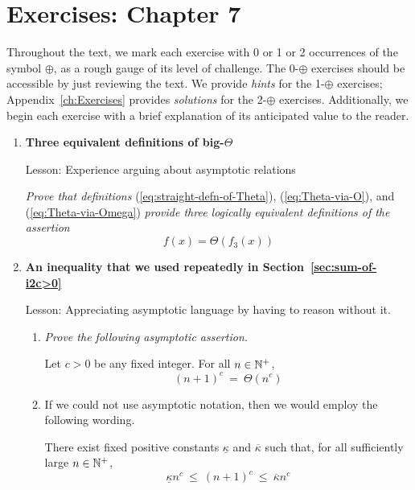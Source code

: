 
\section{Exercises: Chapter 7}

Throughout the text, we mark each exercise with 0 or 1 or 2 occurrences of the symbol $\oplus$, as a rough gauge of its level of challenge.  The 0-$\oplus$ exercises should be accessible by just
reviewing the text.  We provide {\em hints} for the 1-$\oplus$ exercises; Appendix~\ref{ch:Exercises} provides {\em solutions} for the 2-$\oplus$ exercises.  Additionally, we begin each exercise with a brief explanation of its anticipated value to the reader.

\begin{enumerate}
\item
{\bf Three equivalent definitions of big-$\Theta$}

{\sc Lesson:} Experience arguing about asymptotic relations

\smallskip

{\em Prove that definitions} (\ref{eq:straight-defn-of-Theta}), (\ref{eq:Theta-via-O}), and (\ref{eq:Theta-via-Omega}) {\em provide three logically equivalent definitions of the assertion}
\[  f(x) = \Theta(f_3(x)) \]

\medskip\item
{\bf An inequality that we used repeatedly in Section~\ref{sec:sum-of-i2c>0}}

{\sc Lesson:} Appreciating asymptotic language by having to reason without it.

  \begin{enumerate}
  \item
{\em Prove the following asymptotic assertion.}

\begin{prop}
\label{thm:poly-w-asymp}
Let $c > 0$ be any fixed integer.  For all $n \in \mathbb{N}^+$,
\[ (n+1)^c \ = \ \Theta(n^c) \]
\end{prop}

  \medskip\item
If we could not use asymptotic notation, then we would employ the following wording.

\begin{prop}
\label{thm:poly-wo-asymp}
There exist fixed positive constants $\underline{\kappa}$ and $\overline{\kappa}$ such that, for all sufficiently large $n \in \mathbb{N}^+$,
\[ \underline{\kappa} n^c \ \leq \ (n+1)^c \ \leq \ \overline{\kappa} n^c \]
\end{prop}


\end{enumerate}
\end{enumerate}
